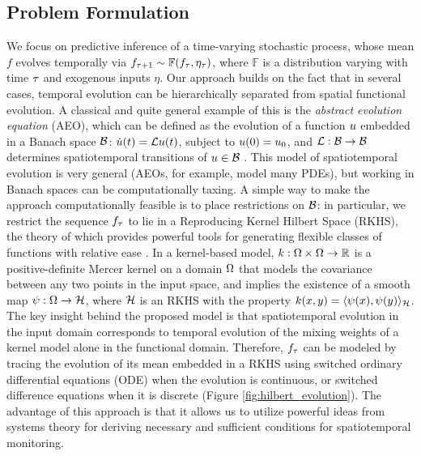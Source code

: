 \vspace{-0.1in}
\subsection{Problem Formulation}\label{sec:formulation}
We focus on predictive inference of a time-varying stochastic process, whose mean $f$ evolves temporally via $f_{\tau+1} \sim \mathbb{F}(f_{\tau},\eta_{\tau})$, where $\mathbb{F}$ is a distribution varying with time $\tau$ and exogenous inputs $\eta$. Our approach builds on the fact that in several cases, temporal evolution can be hierarchically separated from spatial functional evolution. A classical and quite general example of this is the \emph{abstract evolution equation} (AEO), which can be defined as the evolution of a function $u$ embedded in a Banach space $\mathcal{B}$: $\dot{u}(t) = \mathcal{L}u(t)$, subject to $u(0)= u_0$, and $\mathcal{L}:\mathcal{B}\to\mathcal{B}$ determines spatiotemporal transitions of $u\in\mathcal{B}$ \cite{brezis2010functional}. This model of spatiotemporal evolution is very general (AEOs, for example, model many PDEs), but working in Banach spaces can be computationally taxing.  A simple way to make the approach computationally feasible is to place restrictions on $\mathcal{B}$: in particular, we restrict the sequence $f_{\tau}$ to lie in a Reproducing Kernel Hilbert Space (RKHS), the theory of which provides powerful tools for generating flexible classes of functions with relative ease \cite{RasmussenWilliams2005}.
In a kernel-based model, $k:\Omega\times\Omega\to\mathbb{R}$ is a positive-definite Mercer kernel on a domain $\Omega$ that models the covariance between any two points in the input space,  
and implies the existence of a smooth map $\psi:\Omega\to\mathcal{H}$, where $\mathcal{H}$ is an RKHS with the property $k(x,y) = \langle \psi(x),\psi(y) \rangle_{\mathcal{H}}$. The key insight behind the proposed model is that spatiotemporal evolution in the input domain corresponds to temporal evolution of the mixing weights of a kernel model alone in the functional domain. Therefore, $f_{\tau}$ can be modeled by tracing the evolution of its mean embedded in a RKHS using switched ordinary differential equations (ODE) when the evolution is continuous, or switched difference equations when it is discrete (Figure \ref{fig:hilbert_evolution}). 
The advantage of this approach is that it allows us to utilize powerful ideas from systems theory for deriving necessary and sufficient conditions for spatiotemporal monitoring. 

